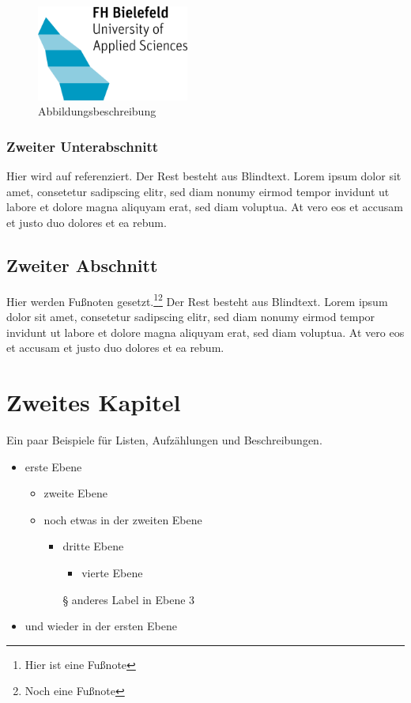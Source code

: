 \documentclass[BCOR=1cm, twoside, ngerman]{scrreprt}
\begin{document}
\begin{figure}
\centering %
\includegraphics[width=5cm]{imgs/logo.png}
\caption{Abbildungsbeschreibung}
\label{fig:logo} %
\end{figure}

\subsection{Zweiter Unterabschnitt}
Hier wird auf  referenziert. Der Rest besteht aus Blindtext. Lorem ipsum dolor sit amet, consetetur sadipscing elitr, sed diam nonumy eirmod tempor invidunt ut labore et dolore magna aliquyam erat, sed diam voluptua. At vero eos et accusam et justo duo dolores et ea rebum.

\section{Zweiter Abschnitt}
Hier werden Fußnoten gesetzt.\footnote{Hier ist eine Fußnote}\footnote{Noch eine Fußnote} Der Rest besteht aus Blindtext. Lorem ipsum dolor sit amet, consetetur sadipscing elitr, sed diam nonumy eirmod tempor invidunt ut labore et dolore magna aliquyam erat, sed diam voluptua. At vero eos et accusam et justo duo dolores et ea rebum.

\chapter{Zweites Kapitel}
Ein paar Beispiele für Listen, Aufzählungen und Beschreibungen.

\begin{itemize}
\item erste Ebene
  \begin{itemize}
  \item zweite Ebene
  \item noch etwas in der zweiten Ebene
    \begin{itemize}
    \item dritte Ebene
      \begin{itemize}
      \item vierte Ebene
      \end{itemize} 
    \item[§] anderes Label in Ebene 3
    \end{itemize}
  \end{itemize}
\item und wieder in der ersten Ebene
\end{itemize}
\end{document}
